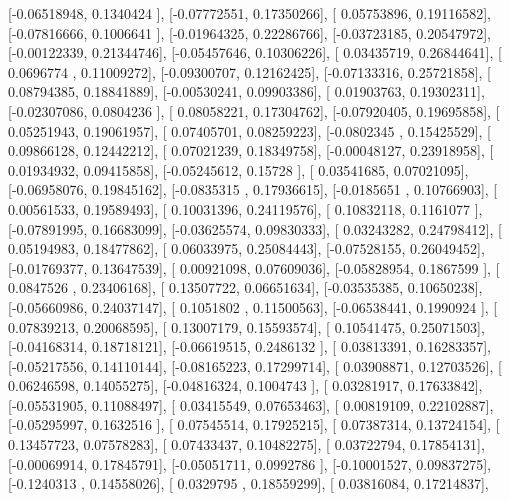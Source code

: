 \documentclass{article}
\begin{document}
       [-0.06518948,  0.1340424 ],
       [-0.07772551,  0.17350266],
       [ 0.05753896,  0.19116582],
       [-0.07816666,  0.1006641 ],
       [-0.01964325,  0.22286766],
       [-0.03723185,  0.20547972],
       [-0.00122339,  0.21344746],
       [-0.05457646,  0.10306226],
       [ 0.03435719,  0.26844641],
       [ 0.0696774 ,  0.11009272],
       [-0.09300707,  0.12162425],
       [-0.07133316,  0.25721858],
       [ 0.08794385,  0.18841889],
       [-0.00530241,  0.09903386],
       [ 0.01903763,  0.19302311],
       [-0.02307086,  0.0804236 ],
       [ 0.08058221,  0.17304762],
       [-0.07920405,  0.19695858],
       [ 0.05251943,  0.19061957],
       [ 0.07405701,  0.08259223],
       [-0.0802345 ,  0.15425529],
       [ 0.09866128,  0.12442212],
       [ 0.07021239,  0.18349758],
       [-0.00048127,  0.23918958],
       [ 0.01934932,  0.09415858],
       [-0.05245612,  0.15728   ],
       [ 0.03541685,  0.07021095],
       [-0.06958076,  0.19845162],
       [-0.0835315 ,  0.17936615],
       [-0.0185651 ,  0.10766903],
       [ 0.00561533,  0.19589493],
       [ 0.10031396,  0.24119576],
       [ 0.10832118,  0.1161077 ],
       [-0.07891995,  0.16683099],
       [-0.03625574,  0.09830333],
       [ 0.03243282,  0.24798412],
       [ 0.05194983,  0.18477862],
       [ 0.06033975,  0.25084443],
       [-0.07528155,  0.26049452],
       [-0.01769377,  0.13647539],
       [ 0.00921098,  0.07609036],
       [-0.05828954,  0.1867599 ],
       [ 0.0847526 ,  0.23406168],
       [ 0.13507722,  0.06651634],
       [-0.03535385,  0.10650238],
       [-0.05660986,  0.24037147],
       [ 0.1051802 ,  0.11500563],
       [-0.06538441,  0.1990924 ],
       [ 0.07839213,  0.20068595],
       [ 0.13007179,  0.15593574],
       [ 0.10541475,  0.25071503],
       [-0.04168314,  0.18718121],
       [-0.06619515,  0.2486132 ],
       [ 0.03813391,  0.16283357],
       [-0.05217556,  0.14110144],
       [-0.08165223,  0.17299714],
       [ 0.03908871,  0.12703526],
       [ 0.06246598,  0.14055275],
       [-0.04816324,  0.1004743 ],
       [ 0.03281917,  0.17633842],
       [-0.05531905,  0.11088497],
       [ 0.03415549,  0.07653463],
       [ 0.00819109,  0.22102887],
       [-0.05295997,  0.1632516 ],
       [ 0.07545514,  0.17925215],
       [ 0.07387314,  0.13724154],
       [ 0.13457723,  0.07578283],
       [ 0.07433437,  0.10482275],
       [ 0.03722794,  0.17854131],
       [-0.00069914,  0.17845791],
       [-0.05051711,  0.0992786 ],
       [-0.10001527,  0.09837275],
       [-0.1240313 ,  0.14558026],
       [ 0.0329795 ,  0.18559299],
       [ 0.03816084,  0.17214837],
\end{document}
